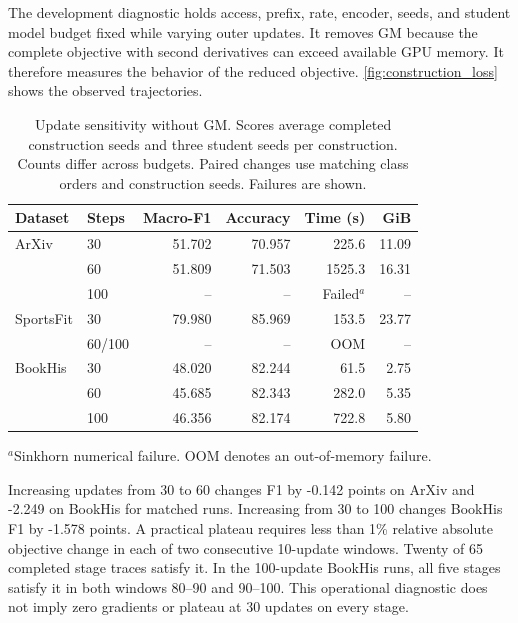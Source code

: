 The development diagnostic holds access, prefix, rate, encoder, seeds, and
student model budget fixed while varying outer updates. It removes GM because
the complete objective with second derivatives can exceed available GPU memory.
It therefore measures the behavior of the reduced objective.
\autoref{fig:construction_loss} shows the observed trajectories.

\begin{table}[H]
\centering
\footnotesize
\setlength{\tabcolsep}{2pt}
\caption{Update sensitivity without GM. Scores average completed construction
seeds and three student seeds per construction. Counts differ across budgets.
Paired changes use matching class orders and construction seeds. Failures are shown.}
\label{tab:construction_steps}
\begin{tabular*}{\linewidth}{@{\extracolsep{\fill}}llrrrr@{}}
\toprule
Dataset & Steps & Macro-F1 & Accuracy & Time (s) & GiB\\
\midrule
ArXiv & 30 & 51.702 & 70.957 & 225.6 & 11.09\\
& 60 & 51.809 & 71.503 & 1525.3 & 16.31\\
& 100 & -- & -- & Failed$^a$ & --\\
SportsFit & 30 & 79.980 & 85.969 & 153.5 & 23.77\\
& 60/100 & -- & -- & OOM & --\\
BookHis & 30 & 48.020 & 82.244 & 61.5 & 2.75\\
& 60 & 45.685 & 82.343 & 282.0 & 5.35\\
& 100 & 46.356 & 82.174 & 722.8 & 5.80\\
\bottomrule
\end{tabular*}
\par\smallskip
\raggedright $^a$Sinkhorn numerical failure. OOM denotes an out-of-memory failure.
\end{table}

Increasing updates from 30 to 60 changes F1 by -0.142 points on ArXiv and
-2.249 on BookHis for matched runs. Increasing from 30 to 100 changes
BookHis F1 by -1.578 points.
A practical plateau requires less than 1\% relative absolute objective
change in each of two consecutive 10-update windows. Twenty of 65 completed
stage traces satisfy it. In the 100-update BookHis runs, all five stages
satisfy it in both windows 80--90 and 90--100. This operational diagnostic
does not imply zero gradients or plateau at 30 updates on every stage.


